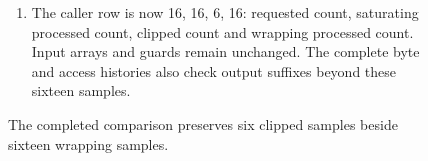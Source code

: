 \begin{figure}[htbp]
\begin{minipage}{\linewidth}
\begin{enumerate}
      \item The caller row is now 16, 16, 6, 16: requested count, saturating processed count, clipped count and wrapping processed count. Input arrays and guards remain unchanged. The complete byte and access histories also check output suffixes beyond these sixteen samples.
    \end{enumerate}
  \end{minipage}
  \caption{The completed comparison preserves six clipped samples beside sixteen wrapping samples.}
  \label{capture:020-pcm-mixing-f03}
  \label{pcm-f03}
\end{figure}
\par
